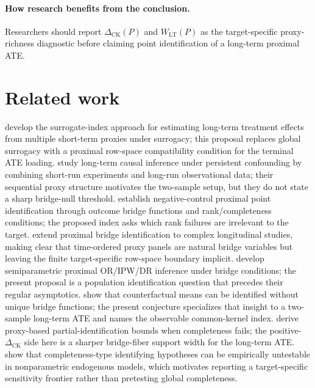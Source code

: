 \documentclass[11pt]{article}
\theoremstyle{definition}
\theoremstyle{plain}
\theoremstyle{remark}
\begin{document}
\paragraph{How research benefits from the conclusion.}
Researchers should report \(\Delta_{\mathrm{CK}}(P)\) and
\(W_{\mathrm{LT}}(P)\) as the target-specific proxy-richness diagnostic before
claiming point identification of a long-term proximal ATE.

\section{Related work}
\citet{AtheyChettyImbensKang2019} develop the surrogate-index approach for
estimating long-term treatment effects from multiple short-term proxies under
surrogacy; this proposal replaces global surrogacy with a proximal row-space
compatibility condition for the terminal ATE loading.  \citet{ImbensKallusMaoWang2025}
study long-term causal inference under persistent confounding by combining
short-run experiments and long-run observational data; their sequential proxy
structure motivates the two-sample setup, but they do not state a sharp
bridge-null threshold.  \citet{MiaoGengTchetgen2018} establish negative-control
proximal point identification through outcome bridge functions and
rank/completeness conditions; the proposed index asks which rank failures are
irrelevant to the target.  \citet{YingMiaoShiTchetgen2023} extend proximal
bridge identification to complex longitudinal studies, making clear that
time-ordered proxy panels are natural bridge variables but leaving the
finite target-specific row-space boundary implicit.  \citet{CuiPuShiMiaoTchetgen2024}
develop semiparametric proximal OR/IPW/DR inference under bridge conditions;
the present proposal is a population identification question that precedes
their regular asymptotics.  \citet{ZhangLiMiaoTchetgen2023} show that
counterfactual means can be identified without unique bridge functions; the
present conjecture specializes that insight to a two-sample long-term ATE and
names the observable common-kernel index.  \citet{GhassamiShpitserTchetgen2023}
derive proxy-based partial-identification bounds when completeness fails; the
positive-\(\Delta_{\mathrm{CK}}\) side here is a sharper bridge-fiber support
width for the long-term ATE.  \citet{CanaySantosShaikh2013} show that
completeness-type identifying hypotheses can be empirically untestable in
nonparametric endogenous models, which motivates reporting a target-specific
sensitivity frontier rather than pretesting global completeness.
\end{document}
